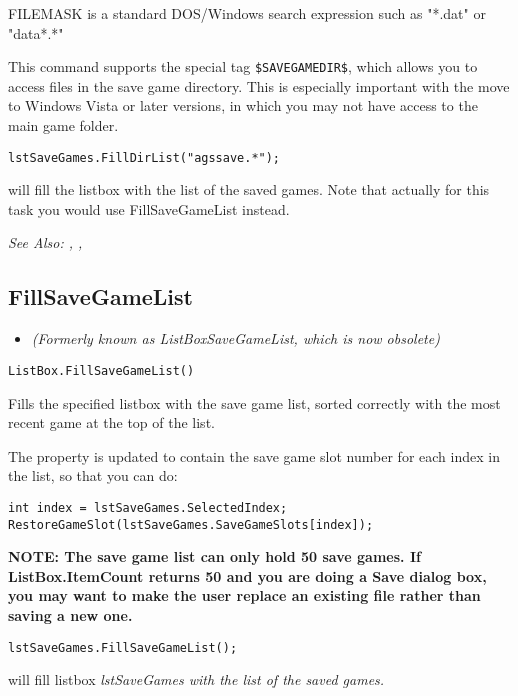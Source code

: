 FILEMASK is a standard DOS/Windows search expression such as "*.dat"
or "data*.*"

This command supports the special tag \verb^$SAVEGAMEDIR$^, which allows
you to access files in the save game directory. This is especially important with
the move to Windows Vista or later versions, in which you may not have access to the main game folder.

\begin{verbatim}
lstSaveGames.FillDirList("agssave.*");
\end{verbatim}
will fill the listbox with the list of the saved games. Note that actually for this
task you would use FillSaveGameList instead.

\it{See Also:} , ,


\subsection{FillSaveGameList}\label{ListBox.FillSaveGameList}%

\begin{itemize}
\item \it{(Formerly known as ListBoxSaveGameList, which is now obsolete)}
\end{itemize}

\begin{verbatim}
ListBox.FillSaveGameList()
\end{verbatim}
Fills the specified listbox with the save game list, sorted correctly
with the most recent game at the top of the list.

The  property is updated to
contain the save game slot number for each index in the list, so that you can do:
\begin{verbatim}
int index = lstSaveGames.SelectedIndex;
RestoreGameSlot(lstSaveGames.SaveGameSlots[index]);
\end{verbatim}
\bf{NOTE:} The save game list can only hold 50 save games. If ListBox.ItemCount
returns 50 and you are doing a Save dialog box, you may want to make the
user replace an existing file rather than saving a new one.

\begin{verbatim}
lstSaveGames.FillSaveGameList();
\end{verbatim}
will fill listbox \it{lstSaveGames} with the list of the saved games.

